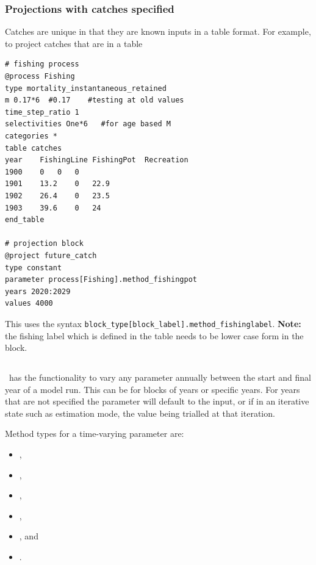 \subsubsection[Catches]{Projections with catches specified}

Catches are unique in that they are known inputs in a table format. For example, to project catches that are in a table

{\small{\begin{verbatim}
# fishing process
@process Fishing
type mortality_instantaneous_retained
m 0.17*6  #0.17    #testing at old values
time_step_ratio 1
selectivities One*6   #for age based M
categories *
table catches
year	FishingLine	FishingPot	Recreation
1900	0	0	0
1901	13.2	0	22.9
1902	26.4	0	23.5
1903	39.6	0	24
end_table

# projection block
@project future_catch
type constant
parameter process[Fishing].method_fishingpot
years 2020:2029
values 4000
\end{verbatim}}}

This uses the syntax \texttt{block\_type[block\_label].method\_fishinglabel}. \textbf{Note:} the fishing label which is defined in the table needs to be lower case form in the  block.

\subsection{\label{sec:time_var}}

\CNAME\ has the functionality to vary any parameter annually between the start and final year of a model run. This can be for blocks of years or specific years. For years that are not specified the parameter will default to the input, or if in an iterative state such as estimation mode, the value being trialled at that iteration.

Method types for a time-varying parameter are: 

\begin{itemize}
\item {},
\item {},
\item {},
\item {},
\item {}, and
\item {}.
\end{itemize}

